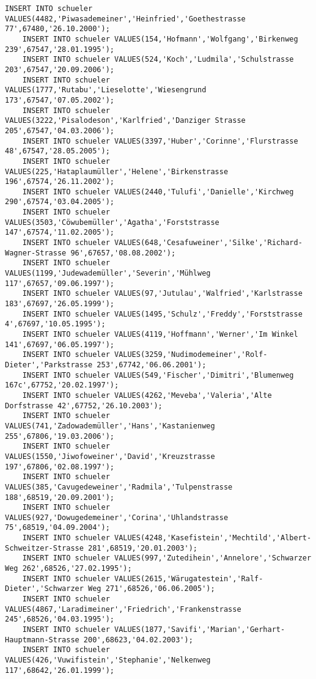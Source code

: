 \begin{lstlisting}[breaklines=True, numbers=none, basicstyle=\tiny, keepspaces=false]
	INSERT INTO schueler VALUES(4482,'Piwasademeiner','Heinfried','Goethestrasse 77',67480,'26.10.2000');
	INSERT INTO schueler VALUES(154,'Hofmann','Wolfgang','Birkenweg 239',67547,'28.01.1995');
	INSERT INTO schueler VALUES(524,'Koch','Ludmila','Schulstrasse 203',67547,'20.09.2006');
	INSERT INTO schueler VALUES(1777,'Rutabu','Lieselotte','Wiesengrund 173',67547,'07.05.2002');
	INSERT INTO schueler VALUES(3222,'Pisalodeson','Karlfried','Danziger Strasse 205',67547,'04.03.2006');
	INSERT INTO schueler VALUES(3397,'Huber','Corinne','Flurstrasse 48',67547,'28.05.2005');
	INSERT INTO schueler VALUES(225,'Hataplaumüller','Helene','Birkenstrasse 196',67574,'26.11.2002');
	INSERT INTO schueler VALUES(2440,'Tulufi','Danielle','Kirchweg 290',67574,'03.04.2005');
	INSERT INTO schueler VALUES(3503,'Cöwubemüller','Agatha','Forststrasse 147',67574,'11.02.2005');
	INSERT INTO schueler VALUES(648,'Cesafuweiner','Silke','Richard-Wagner-Strasse 96',67657,'08.08.2002');
	INSERT INTO schueler VALUES(1199,'Judewademüller','Severin','Mühlweg 117',67657,'09.06.1997');
	INSERT INTO schueler VALUES(97,'Jutulau','Walfried','Karlstrasse 183',67697,'26.05.1999');
	INSERT INTO schueler VALUES(1495,'Schulz','Freddy','Forststrasse 4',67697,'10.05.1995');
	INSERT INTO schueler VALUES(4119,'Hoffmann','Werner','Im Winkel 141',67697,'06.05.1997');
	INSERT INTO schueler VALUES(3259,'Nudimodemeiner','Rolf-Dieter','Parkstrasse 253',67742,'06.06.2001');
	INSERT INTO schueler VALUES(549,'Fischer','Dimitri','Blumenweg 167c',67752,'20.02.1997');
	INSERT INTO schueler VALUES(4262,'Meveba','Valeria','Alte Dorfstrasse 42',67752,'26.10.2003');
	INSERT INTO schueler VALUES(741,'Zadowademüller','Hans','Kastanienweg 255',67806,'19.03.2006');
	INSERT INTO schueler VALUES(1550,'Jiwofoweiner','David','Kreuzstrasse 197',67806,'02.08.1997');
	INSERT INTO schueler VALUES(385,'Cavugedeweiner','Radmila','Tulpenstrasse 188',68519,'20.09.2001');
	INSERT INTO schueler VALUES(927,'Dowugedemeiner','Corina','Uhlandstrasse 75',68519,'04.09.2004');
	INSERT INTO schueler VALUES(4248,'Kasefistein','Mechtild','Albert-Schweitzer-Strasse 281',68519,'20.01.2003');
	INSERT INTO schueler VALUES(997,'Zutedihein','Annelore','Schwarzer Weg 262',68526,'27.02.1995');
	INSERT INTO schueler VALUES(2615,'Wärugatestein','Ralf-Dieter','Schwarzer Weg 271',68526,'06.06.2005');
	INSERT INTO schueler VALUES(4867,'Laradimeiner','Friedrich','Frankenstrasse 245',68526,'04.03.1995');
	INSERT INTO schueler VALUES(1877,'Savifi','Marian','Gerhart-Hauptmann-Strasse 200',68623,'04.02.2003');
	INSERT INTO schueler VALUES(426,'Vuwifistein','Stephanie','Nelkenweg 117',68642,'26.01.1999');

\end{lstlisting}
